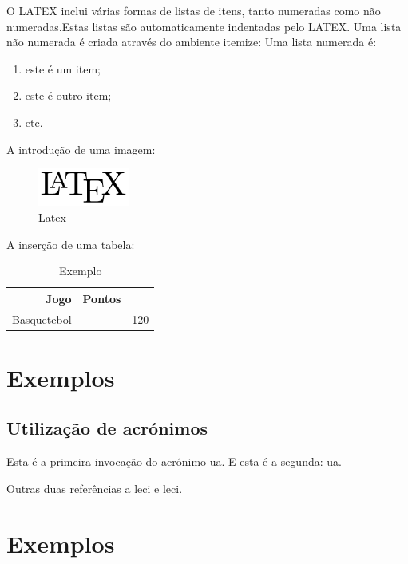 \documentclass{report}
\begin{document}
O LATEX inclui várias formas de listas de itens, tanto numeradas como não numeradas.Estas listas são automaticamente indentadas pelo LATEX. Uma lista não numerada é criada através do ambiente itemize:
Uma lista numerada é:
\begin{enumerate}
\item este é um item;
\item este é outro item;
\item etc.
\end{enumerate}


A introdução de uma imagem:
\begin{figure}[h]
\center
\includegraphics[width=3cm]{Latex.jpeg} %
\caption{Latex}
\label{figura:latex}
\end{figure}

A inserção de uma tabela:
\begin{table}[h]
\center

\begin{tabular}{r|lr}

Jogo & Pontos\\ %
\hline                               %
 Basquetebol   &      & 120\\
\end{tabular}
\caption{Exemplo}
\label{tabela}
\end{table}


\clearpage



\section{Exemplos}

\subsection{Utilização de acrónimos}
Esta é a primeira invocação do acrónimo \ac{ua}.
E esta é a segunda: \ac{ua}.

Outras duas referências a \ac{leci}
e \ac{leci}.

\section{Exemplos}
\end{document}
